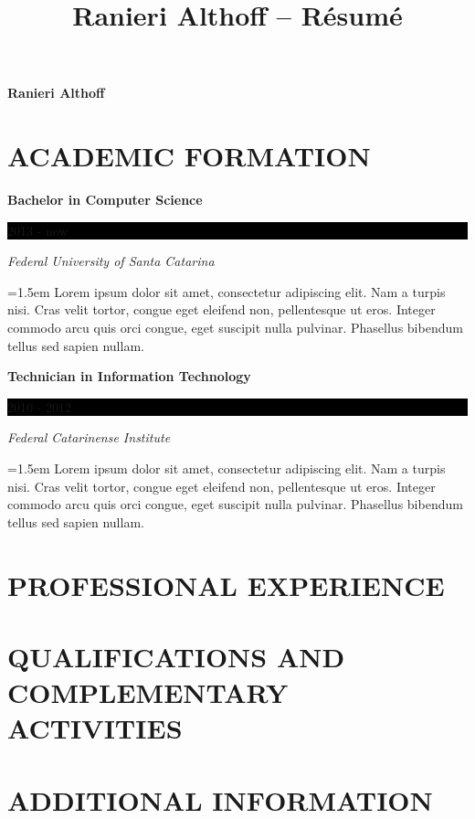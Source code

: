 \documentclass[10pt]{article}
\newcommand{\sectiontitle}[1]{\section*{\uppercase{#1}}}
\begin{document}
 \selectfont

\title{Ranieri Althoff -- Résumé}

\Huge \hfill \textbf{Ranieri Althoff}
\normalsize \par

\sectiontitle{Academic Formation}
\noindent \textbf{Bachelor in Computer Science} \hfill
\colorbox{black}{
	\parbox{8em}{
		\hfill \color{white} 2013 - now
	}
} \par
\noindent \textit{Federal University of Santa Catarina} \par
\noindent \hangindent=1.5em  \small Lorem ipsum dolor sit amet,
	consectetur adipiscing elit. Nam a turpis nisi. Cras velit tortor, congue
	eget eleifend non, pellentesque ut eros.  Integer commodo arcu quis orci
	congue, eget suscipit nulla pulvinar. Phasellus bibendum tellus sed
	sapien nullam. \par
\normalsize
\vspace{1em}

\noindent \textbf{Technician in Information Technology} \hfill
\colorbox{black}{
	\parbox{8em}{
		\hfill \color{white} 2010 - 2012
	}
} \par
\noindent \textit{Federal Catarinense Institute} \par
\noindent \hangindent=1.5em  \small Lorem ipsum dolor sit amet,
	consectetur adipiscing elit. Nam a turpis nisi. Cras velit tortor, congue
	eget eleifend non, pellentesque ut eros.  Integer commodo arcu quis orci
	congue, eget suscipit nulla pulvinar. Phasellus bibendum tellus sed
	sapien nullam. \par
\normalsize
\vspace{1em}


\sectiontitle{Professional Experience}


\sectiontitle{Qualifications and Complementary Activities}


\sectiontitle{Additional Information}
\end{document}
